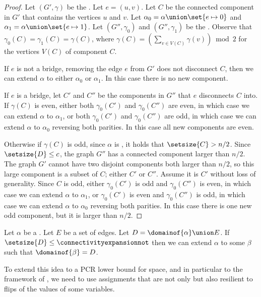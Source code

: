 \documentclass{toc}
\begin{document}
\begin{proof}
  Let $(G',\gamma)$ be the \inducedgraph{$\alpha$}. Let $e=(u,v)$. Let $C$ be the connected component in $G'$ that contains the vertices $u$ and $v$. Let $\alpha_0=\alpha\union\set{e\mapsto 0}$ and $\alpha_1=\alpha\union\set{e\mapsto 1}$. Let $(G'',\gamma_0)$ and $(G'',\gamma_1)$ be the . Observe that $\gamma_0(C)=\gamma_1(C)=\gamma(C)$, where $\gamma(C) = \left(\sum_{v \in V(C)} \gamma(v)\right) \bmod 2$ for the vertices $V(C)$ of component $C$.

If $e$ is not a bridge, \ieComma removing the edge $e$ from $G'$ does not disconnect $C$, then we can extend $\alpha$ to either $\alpha_0$ or $\alpha_1$. In this case there is no new component.

If $e$ is a bridge, let $C'$ and $C''$ be the components in $G''$ that $e$ disconnects $C$ into. If $\gamma(C)$ is even, either both $\gamma_0(C')$ and $\gamma_0(C'')$ are even, in which case we can extend $\alpha$ to $\alpha_1$, or both $\gamma_0(C')$ and $\gamma_0(C'')$ are odd, in which case we can extend $\alpha$ to $\alpha_0$ reversing both parities. In this case all new components are even.

Otherwise if $\gamma(C)$ is odd, since $\alpha$ is \nonsplitting, it holds that $\setsize{C}>n/2$. Since $\setsize{D}\leq c$, the graph $G''$ has a connected component larger than $n/2$. The graph $G'$ cannot have two disjoint components both larger than $n/2$, so this large component is a subset of $C$; either $C'$ or $C''$. Assume it is $C'$ without loss of generality. Since $C$ is odd, either $\gamma_0(C')$ is odd and $\gamma_0(C'')$ is even, in which case we can extend $\alpha$ to $\alpha_1$, or $\gamma_0(C')$ is even and $\gamma_0(C'')$ is odd, in which case we can extend $\alpha$ to $\alpha_0$ reversing both parities. In this case there is one new odd component, but it is larger than $n/2$.
\end{proof}
\begin{corollary}
  \label{cor:extend-non-splitting}
  Let $\alpha$ be a \nonsplittingassignment. Let $E$ be a set of edges. Let $D=\domainof{\alpha}\union E$. If $\setsize{D}\leq \connectivityexpansionnot$ then we can extend $\alpha$ to some \nonsplittingassignment $\beta$ such that $\domainof{\beta}=D$.
\end{corollary}

To extend this idea to a PCR lower bound for space, and in particular to the framework of \cite{BG15Framework}, we need to use assignments that are not only \nonsplitting{} but also resilient to flips of the values of some variables.
\end{document}
